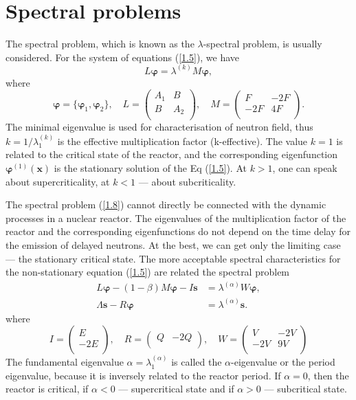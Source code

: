 \documentclass[a4paper]{jpconf}
\begin{document}
\section{Spectral problems}
The spectral problem, which is known as the $\lambda$-spectral problem, is usually considered.
For the system of equations (\ref{1.5}), we have
\begin{equation}\label{1.8}
L \bm \varphi = \lambda^{(k)} M \bm \varphi,
\end{equation}
where
\[
\bm \varphi = \{\bm \varphi_1, \bm \varphi_2\},
\quad
L = \begin{pmatrix}
A_1 & B \\
B & A_2 \\
\end{pmatrix},
\quad
M = \begin{pmatrix}
F & -2F \\
-2F & 4F \\
\end{pmatrix}.
\]
The minimal eigenvalue is used for characterisation of neutron field, thus $k = 1 /\lambda^{(k)}_1$ is the effective multiplication factor (k-effective).
The value $k = 1$ is related to the critical state of the reactor, and the corresponding eigenfunction $\bm{\varphi}^{(1)}(\bm x)$ is the stationary solution of the Eq (\ref{1.5}).
At $k > 1$, one can speak about supercriticality, at $k < 1$ --- about subcriticality.

The spectral problem (\ref{1.8}) cannot directly be connected with the
dynamic processes in a nuclear reactor. The eigenvalues of the multiplication factor of the reactor and the corresponding eigenfunctions do not depend on the time delay for the emission of delayed neutrons. 
At the best, we can get only the limiting case --- the stationary critical state.
The more acceptable spectral characteristics for the non-stationary equation (\ref{1.5}) are related the spectral problem
\begin{equation}\label{1.9}
\begin{split}
L \bm \varphi - (1 - \beta) M \bm \varphi - I \bm s &= \lambda^{(\alpha)} W \bm \varphi, \\
\Lambda \bm s - R \bm \varphi  &= \lambda^{(\alpha)} \bm s.
\end{split}
\end{equation}
where
\[
I = \begin{pmatrix}
E \\
-2E \\
\end{pmatrix},
\quad
R = \begin{pmatrix}
Q & -2Q \\
\end{pmatrix},
\quad
W = \begin{pmatrix}
V & -2V \\
-2V & 9V \\
\end{pmatrix}
\]
The fundamental eigenvalue $\alpha = \lambda^{(\alpha)}_1$ is called \cite{bell1970} the $\alpha$-eigenvalue or the period eigenvalue, because it is inversely related to the reactor period. If $\alpha = 0$, then the reactor is critical, if $\alpha < 0$ --- supercritical state and if $\alpha > 0$ --- subcritical state.
\end{document}
